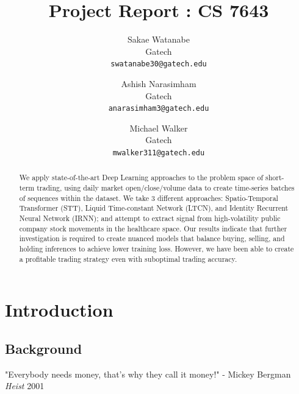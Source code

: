 \documentclass[10pt,twocolumn,letterpaper]{article}
\begin{document}
\title{Project Report : CS 7643}

\author{Sakae Watanabe\\
Gatech\\
{\tt\small swatanabe30@gatech.edu}
\and
Ashish Narasimham\\
Gatech\\
{\tt\small anarasimham3@gatech.edu}
\and
Michael Walker\\
Gatech\\
{\tt\small mwalker311@gatech.edu}
}

\maketitle

\begin{abstract}
    We apply state-of-the-art Deep Learning approaches to the problem space of short-term trading, using daily market open/close/volume data to create time-series batches of sequences within the dataset. We take 3 different approaches: Spatio-Temporal Transformer (STT), Liquid Time-constant Network (LTCN), and Identity Recurrent Neural Network (IRNN); and attempt to extract signal from high-volatility public company stock movements in the healthcare space. Our results indicate that further investigation is required to create nuanced models that balance buying, selling, and holding inferences to achieve lower training loss. However, we have been able to create a profitable trading strategy even with suboptimal trading accuracy.

\end{abstract}

\section{Introduction}

\subsection{Background} 

"Everybody needs money, that's why they call it money!" - Mickey Bergman \textit{Heist} 2001
\end{document}
